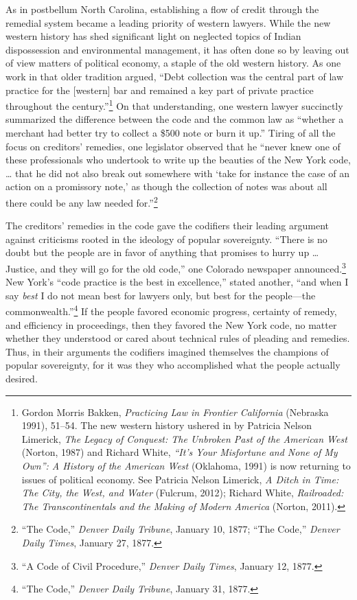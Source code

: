 \documentclass[12pt,]{article}
\let\rmarkdownfootnote\footnote%
\def\footnote{\protect\rmarkdownfootnote}
\begin{document}
As in postbellum North Carolina, establishing a flow of credit through
the remedial system became a leading priority of western lawyers. While
the new western history has shed significant light on neglected topics
of Indian dispossession and environmental management, it has often done
so by leaving out of view matters of political economy, a staple of the
old western history. As one work in that older tradition argued, ``Debt
collection was the central part of law practice for the {[}western{]}
bar and remained a key part of private practice throughout the
century.''\footnote{Gordon Morris Bakken, \emph{Practicing Law in
  Frontier California} (Nebraska 1991), 51--54. The new western history
  ushered in by Patricia Nelson Limerick, \emph{The Legacy of Conquest:
  The Unbroken Past of the American West} (Norton, 1987) and Richard
  White, \emph{``It's Your Misfortune and None of My Own'': A History of
  the American West} (Oklahoma, 1991) is now returning to issues of
  political economy. See Patricia Nelson Limerick, \emph{A Ditch in
  Time: The City, the West, and Water} (Fulcrum, 2012); Richard White,
  \emph{Railroaded: The Transcontinentals and the Making of Modern
  America} (Norton, 2011).} On that understanding, one western lawyer
succinctly summarized the difference between the code and the common law
as ``whether a merchant had better try to collect a \$500 note or burn
it up.'' Tiring of all the focus on creditors' remedies, one legislator
observed that he ``never knew one of these professionals who undertook
to write up the beauties of the New York code, \ldots{} that he did not
also break out somewhere with `take for instance the case of an action
on a promissory note,' as though the collection of notes was about all
there could be any law needed for.''\footnote{``The Code,'' \emph{Denver
  Daily Tribune}, January 10, 1877; ``The Code,'' \emph{Denver Daily
  Times}, January 27, 1877.}

The creditors' remedies in the code gave the codifiers their leading
argument against criticisms rooted in the ideology of popular
sovereignty. ``There is no doubt but the people are in favor of anything
that promises to hurry up \ldots{} Justice, and they will go for the old
code,'' one Colorado newspaper announced.\footnote{``A Code of Civil
  Procedure,'' \emph{Denver Daily Times}, January 12, 1877.} New York's
``code practice is the best in excellence,'' stated another, ``and when
I say \emph{best} I do not mean best for lawyers only, but best for the
people---the commonwealth.''\footnote{``The Code,'' \emph{Denver Daily
  Tribune}, January 31, 1877.} If the people favored economic progress,
certainty of remedy, and efficiency in proceedings, then they favored
the New York code, no matter whether they understood or cared about
technical rules of pleading and remedies. Thus, in their arguments the
codifiers imagined themselves the champions of popular sovereignty, for
it was they who accomplished what the people actually desired.
\end{document}
